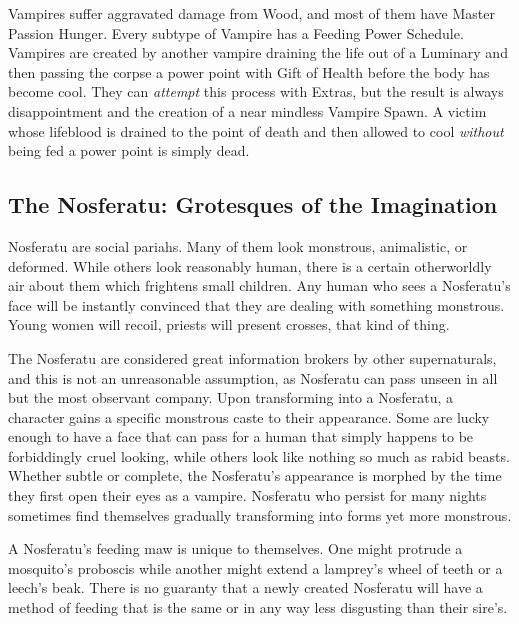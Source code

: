 Vampires suffer aggravated damage from Wood, and most of them have Master Passion Hunger. Every subtype of Vampire has a Feeding Power Schedule. Vampires are created by another vampire draining the life out of a Luminary and then passing the corpse a power point with Gift of Health before the body has become cool. They can \textit{attempt} this process with Extras, but the result is always disappointment and the creation of a near mindless Vampire Spawn. A victim whose lifeblood is drained to the point of death and then allowed to cool \textit{without} being fed a power point is simply dead.

\subsection[Nosferatu]{The Nosferatu: Grotesques of the Imagination} 

Nosferatu are social pariahs. Many of them look monstrous, animalistic, or deformed. While others look reasonably human, there is a certain otherworldly air about them which frightens small children. Any human who sees a Nosferatu's face will be instantly convinced that they are dealing with something monstrous. Young women will recoil, priests will present crosses, that kind of thing.

The Nosferatu are considered great information brokers by other supernaturals, and this is not an unreasonable assumption, as Nosferatu can pass unseen in all but the most observant company. Upon transforming into a Nosferatu, a character gains a specific monstrous caste to their appearance. Some are lucky enough to have a face that can pass for a human that simply happens to be forbiddingly cruel looking, while others look like nothing so much as rabid beasts. Whether subtle or complete, the Nosferatu's appearance is morphed by the time they first open their eyes as a vampire. Nosferatu who persist for many nights sometimes find themselves gradually transforming into forms yet more monstrous.

A Nosferatu's feeding maw is unique to themselves. One might protrude a mosquito's proboscis while another might extend a lamprey's wheel of teeth or a leech's beak. There is no guaranty that a newly created Nosferatu will have a method of feeding that is the same or in any way less disgusting than their sire's.

